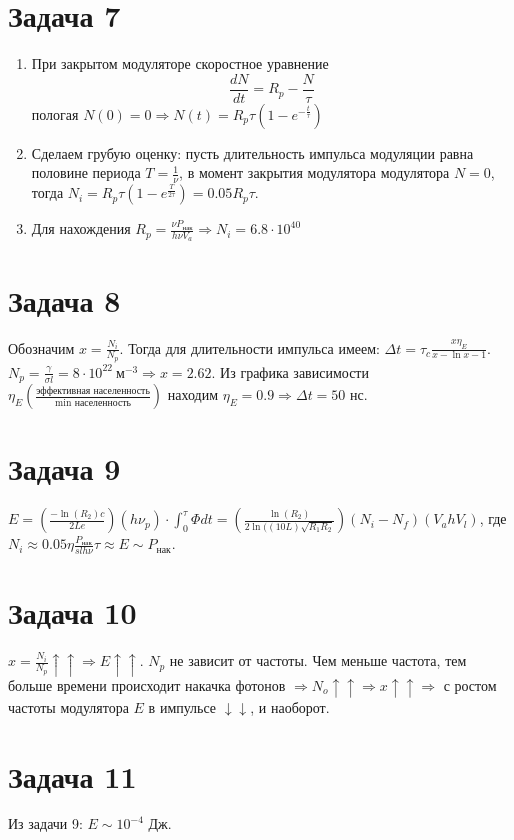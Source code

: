 \documentclass[a4paper, 12pt]{article}
\begin{document}
\section*{Задача 7}
\begin{enumerate}
\item При закрытом модуляторе скоростное уравнение
\begin{equation*}
	\frac{dN}{dt}=R_p-\frac{N}{\tau}
\end{equation*}
пологая $N(0)=0\Rightarrow N(t)=R_p\tau(1-e^{-\frac{t}{\tau}})$
\item Сделаем грубую оценку: пусть длительность импульса модуляции равна половине периода $T=\frac{1}{\nu}$, в момент закрытия модулятора модулятора $N=0$, тогда $N_i=R_p\tau(1-e^{\frac{T}{2\tau}})=0.05 R_p\tau$.
\item Для нахождения $R_p=\frac{\nu P_{\text{нак}}}{h\nu V_a}\Rightarrow N_i=6.8\cdot10^{40}$
\end{enumerate}
\section*{Задача 8}
Обозначим $x=\frac{N_i}{N_p}$. Тогда для длительности импульса имеем: $\Delta t=\tau_c\frac{x\eta_E}{x-\ln x-1}$. $N_p=\frac{\gamma}{\sigma l}=8\cdot 10^{22}\ \text{м}^{-3}\Rightarrow x=2.62$. Из графика зависимости $\eta_E\left(\frac{\text{эффективная населенность}}{\min\text{ населенность}}\right)$ находим $\eta_E=0.9\Rightarrow\Delta t=50$ нс.
\section*{Задача 9}
$E=\left(\frac{-\ln(R_2)c}{2Le}\right)(h\nu_p)\cdot\int_0^\tau\Phi dt=\left(\frac{\ln(R_2)}{2\ln((10L)\sqrt{R_1R_2}}\right)(N_i-N_f)(V_ahV_l)$, где $N_i\approx 0.05\eta\frac{P_{\text{нак}}}{slh\nu}\tau\approx E\sim P_{\text{нак}}$.
\section*{Задача 10}
$x=\frac{N_i}{N_p}\uparrow\uparrow\Rightarrow E\uparrow\uparrow$. $N_p$ не зависит от частоты. Чем меньше частота, тем больше времени происходит накачка фотонов $\Rightarrow N_o\uparrow\uparrow\Rightarrow x\uparrow\uparrow\Rightarrow$ с ростом частоты модулятора $E$ в импульсе $\downarrow\downarrow$, и наоборот.
\section*{Задача 11}
Из задачи 9: $E\sim 10^{-4}$ Дж.
\end{document}
